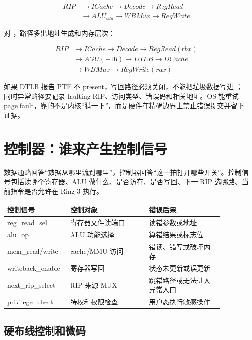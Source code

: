 \[
\begin{aligned}
RIP &\rightarrow ICache \rightarrow Decode \rightarrow RegRead \\
    &\rightarrow ALU_{add} \rightarrow WBMux \rightarrow RegWrite
\end{aligned}
\]

对 ，路径多出地址生成和内存层次：

\[
\begin{aligned}
RIP &\rightarrow ICache \rightarrow Decode \rightarrow RegRead(rbx) \\
    &\rightarrow AGU(+16) \rightarrow DTLB \rightarrow DCache \\
    &\rightarrow WBMux \rightarrow RegWrite(rax)
\end{aligned}
\]

如果 DTLB 报告 PTE 不 present，写回路径必须关闭，不能把垃圾数据写进 ；同时异常路径要记录 faulting RIP、访问类型、错误码和相关地址。OS 能重试 page fault，靠的不是内核“猜一下”，而是硬件在精确边界上禁止错误提交并留下证据。

\section{控制器：谁来产生控制信号}

数据通路回答“数据从哪里流到哪里”，控制器回答“这一拍打开哪些开关”。控制信号包括读哪个寄存器、ALU 做什么、是否访存、是否写回、下一 RIP 选哪路、当前指令是否允许在 Ring 3 执行。

\begin{longtable}{p{0.22\linewidth}p{0.34\linewidth}p{0.32\linewidth}}
\toprule
控制信号 & 控制对象 & 错误后果 \\
\midrule
reg\_read\_sel & 寄存器文件读端口 & 读错参数或地址 \\
alu\_op & ALU 功能选择 & 算错结果或标志位 \\
mem\_read/write & cache/MMU 访问 & 错读、错写或破坏内存 \\
writeback\_enable & 寄存器写回 & 状态未更新或误更新 \\
next\_rip\_select & RIP 来源 MUX & 跳错路径或无法进入异常入口 \\
privilege\_check & 特权和权限检查 & 用户态执行敏感操作 \\
\bottomrule
\end{longtable}

\subsection{硬布线控制和微码}

